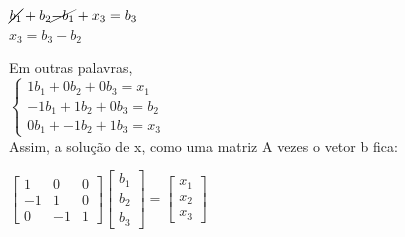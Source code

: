 \documentclass[paper=a4]{article}
\begin{document}
{{\begin{center}
		$\cancel{b_1} + b_2 \cancel{-b_1} + x_3 = b_3$\\
		\vspace{0.3cm}
		$x_3 = b_3 - b_2$\\
	\end{center}
	Em outras palavras,\\
	\newline
	$
	\left\{
	\begin{array}{c}
		1b_1 + 0b_2 + 0b_3 = x_1\\
		-1b_{1} + 1b_{2} + 0b_3 = b_2\\
		0b_1 + -1b_2 + 1b_3 = x_3
	\end{array}
	\right.
	$\\
	\newline
	Assim, a solução de x, como uma matriz A vezes o vetor b fica:
	\begin{center}{\Large$
		\begin{bmatrix}
			1 & 0 & 0\\
			-1 & 1 & 0 \\
			0 & -1 & 1
		\end{bmatrix}
		\begin{bmatrix}
			b_1\\
			b_2\\
			b_3
		\end{bmatrix} =
		\begin{bmatrix}
			x_1\\
			x_2\\
			x_3
		\end{bmatrix}
	$} \end{center}  
	\newpage
	
}}
\end{document}

